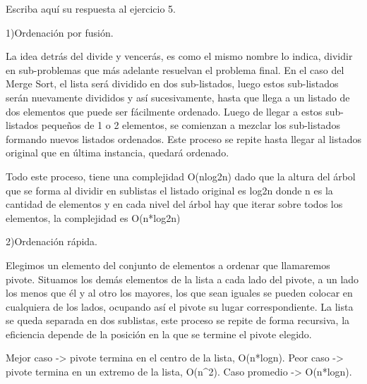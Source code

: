Escriba aquí su respuesta al ejercicio 5.

1)Ordenación por fusión.

La idea detrás del divide y vencerás, es como el mismo nombre lo indica, dividir en sub-problemas que más adelante resuelvan el problema final. 
En el caso del Merge Sort, el lista será dividido en dos sub-listados, luego estos sub-listados serán nuevamente divididos
y así sucesivamente, hasta que llega a un listado de dos elementos que puede ser fácilmente ordenado. Luego de llegar a estos sub-listados pequeños de 1 o 2 elementos,
se comienzan a mezclar los sub-listados formando nuevos listados ordenados. Este proceso se repite hasta llegar al listados original que en última instancia, quedará ordenado.

Todo este proceso, tiene una complejidad O(nlog2n) dado que la altura del árbol que se forma al dividir en
sublistas el listado original es log2n donde n es la cantidad de elementos y en cada nivel del árbol 
hay que iterar sobre todos los elementos, la complejidad es O(n*log2n) 

 2)Ordenación rápida.

 Elegimos un elemento del conjunto de elementos a ordenar que llamaremos pivote.
 Situamos los demás elementos de la lista a cada lado del pivote, a un lado los menos que él y al otro los mayores, los que
 sean iguales se pueden colocar en cualquiera de los lados, ocupando así el pivote su lugar correspondiente.
 La lista se queda separada en dos sublistas, este proceso se repite de forma recursiva, la eficiencia depende de la posición en la que
 se termine el pivote elegido.

 Mejor caso -> pivote termina en el centro de la lista, O(n*logn).
 Peor caso -> pivote termina en un extremo de la lista, O(n^2).
 Caso promedio -> O(n*logn).
